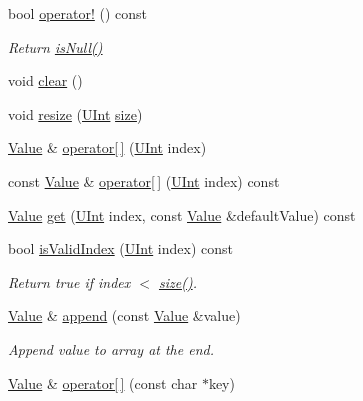 \begin{DoxyCompactItemize}
bool \hyperlink{classJson_1_1Value_a021ab0d15a807fbe051446c9c545ab61}{operator!} () const 
\begin{DoxyCompactList}\small\item\em Return \hyperlink{classJson_1_1Value_aeb9ad8b1bb91bdd72203dc884b3f4362}{is\-Null()} \end{DoxyCompactList}\item 
void \hyperlink{classJson_1_1Value_a501a4d67e6c875255c2ecc03ccd2019b}{clear} ()
\item 
void \hyperlink{classJson_1_1Value_a9ac3948baaa27f9f7bbf65fa8301484f}{resize} (\hyperlink{classJson_1_1Value_a0933d59b45793ae4aade1757c322a98d}{U\-Int} \hyperlink{classJson_1_1Value_a69d4f979237e19aabef12de56c18c38f}{size})
\item 
\hyperlink{classJson_1_1Value}{Value} \& \hyperlink{classJson_1_1Value_a83267de2c43047529d90f35ced020ba9}{operator\mbox{[}$\,$\mbox{]}} (\hyperlink{classJson_1_1Value_a0933d59b45793ae4aade1757c322a98d}{U\-Int} index)
\item 
const \hyperlink{classJson_1_1Value}{Value} \& \hyperlink{classJson_1_1Value_a90d15ba05ca251568567e165529af8a3}{operator\mbox{[}$\,$\mbox{]}} (\hyperlink{classJson_1_1Value_a0933d59b45793ae4aade1757c322a98d}{U\-Int} index) const 
\item 
\hyperlink{classJson_1_1Value}{Value} \hyperlink{classJson_1_1Value_aff2e3a2e9fd5db5469588ab7b501d4db}{get} (\hyperlink{classJson_1_1Value_a0933d59b45793ae4aade1757c322a98d}{U\-Int} index, const \hyperlink{classJson_1_1Value}{Value} \&default\-Value) const 
\item 
bool \hyperlink{classJson_1_1Value_a193dd42bf77a7a704971e6de07656367}{is\-Valid\-Index} (\hyperlink{classJson_1_1Value_a0933d59b45793ae4aade1757c322a98d}{U\-Int} index) const 
\begin{DoxyCompactList}\small\item\em Return true if index $<$ \hyperlink{classJson_1_1Value_a69d4f979237e19aabef12de56c18c38f}{size()}. \end{DoxyCompactList}\item 
\hyperlink{classJson_1_1Value}{Value} \& \hyperlink{classJson_1_1Value_a3b7c0ef3bb1958cafdf10483e93ed711}{append} (const \hyperlink{classJson_1_1Value}{Value} \&value)
\begin{DoxyCompactList}\small\item\em Append value to array at the end. \end{DoxyCompactList}\item 
\hyperlink{classJson_1_1Value}{Value} \& \hyperlink{classJson_1_1Value_aa744825e8edd61f538fa7e718f876dcc}{operator\mbox{[}$\,$\mbox{]}} (const char $\ast$key)

\end{DoxyCompactItemize}
